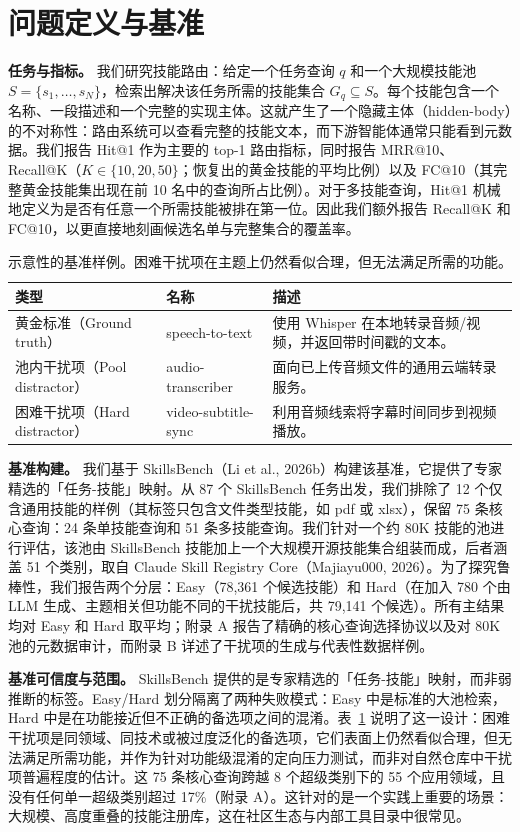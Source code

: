 \documentclass[11pt,UTF8,fontset=fandol]{ctexart}
\makeatletter
\newcommand{\Hit}{Hit@1}
\makeatother
\begin{document}
\section{问题定义与基准}

\textbf{任务与指标。} 我们研究技能路由：给定一个任务查询 $q$ 和一个大规模技能池 $S = \{s_1, \dots, s_N\}$，检索出解决该任务所需的技能集合 $G_q \subseteq S$。每个技能包含一个名称、一段描述和一个完整的实现主体。这就产生了一个隐藏主体（hidden-body）的不对称性：路由系统可以查看完整的技能文本，而下游智能体通常只能看到元数据。我们报告 \Hit{} 作为主要的 top-1 路由指标，同时报告 MRR@10、Recall@K（$K \in \{10, 20, 50\}$；恢复出的黄金技能的平均比例）以及 FC@10（其完整黄金技能集出现在前 10 名中的查询所占比例）。对于多技能查询，\Hit{} 机械地定义为是否有任意一个所需技能被排在第一位。因此我们额外报告 Recall@K 和 FC@10，以更直接地刻画候选名单与完整集合的覆盖率。

\begin{table}[H]\centering
\caption{示意性的基准样例。困难干扰项在主题上仍然看似合理，但无法满足所需的功能。}
\begin{tabular}{p{3.2cm} p{3.6cm} p{6.0cm}}
\toprule
类型 & 名称 & 描述 \\ \midrule
黄金标准（Ground truth） & speech-to-text & 使用 Whisper 在本地转录音频/视频，并返回带时间戳的文本。 \\
池内干扰项（Pool distractor） & audio-transcriber & 面向已上传音频文件的通用云端转录服务。 \\
困难干扰项（Hard distractor） & video-subtitle-sync & 利用音频线索将字幕时间同步到视频播放。 \\
\bottomrule
\end{tabular}
\label{tab:1}
\end{table}

\textbf{基准构建。} 我们基于 SkillsBench（Li et al., 2026b）构建该基准，它提供了专家精选的「任务-技能」映射。从 87 个 SkillsBench 任务出发，我们排除了 12 个仅含通用技能的样例（其标签只包含文件类型技能，如 pdf 或 xlsx），保留 75 条核心查询：24 条单技能查询和 51 条多技能查询。我们针对一个约 80K 技能的池进行评估，该池由 SkillsBench 技能加上一个大规模开源技能集合组装而成，后者涵盖 51 个类别，取自 Claude Skill Registry Core（Majiayu000, 2026）。为了探究鲁棒性，我们报告两个分层：Easy（78,361 个候选技能）和 Hard（在加入 780 个由 LLM 生成、主题相关但功能不同的干扰技能后，共 79,141 个候选）。所有主结果均对 Easy 和 Hard 取平均；附录 A 报告了精确的核心查询选择协议以及对 80K 池的元数据审计，而附录 B 详述了干扰项的生成与代表性数据样例。

\textbf{基准可信度与范围。} SkillsBench 提供的是专家精选的「任务-技能」映射，而非弱推断的标签。Easy/Hard 划分隔离了两种失败模式：Easy 中是标准的大池检索，Hard 中是在功能接近但不正确的备选项之间的混淆。表~\ref{tab:1} 说明了这一设计：困难干扰项是同领域、同技术或被过度泛化的备选项，它们表面上仍然看似合理，但无法满足所需功能，并作为针对功能级混淆的定向压力测试，而非对自然仓库中干扰项普遍程度的估计。这 75 条核心查询跨越 8 个超级类别下的 55 个应用领域，且没有任何单一超级类别超过 17\%（附录 A）。这针对的是一个实践上重要的场景：大规模、高度重叠的技能注册库，这在社区生态与内部工具目录中很常见。
\end{document}
